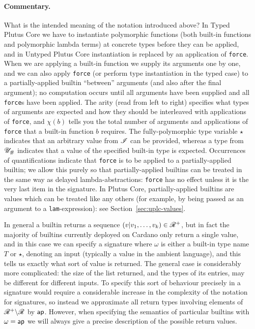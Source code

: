 \paragraph{Commentary.} What is the intended meaning of the notation introduced
above?  In Typed Plutus Core we have to instantiate polymorphic functions (both
built-in functions and polymorphic lambda terms) at concrete types before they
can be applied, and in Untyped Plutus Core instantiation is replaced by an
application of \texttt{force}.  When we are applying a built-in function we
supply its arguments one by one, and we can also apply \texttt{force} (or
perform type instantiation in the typed case) to a partially-applied builtin
``between'' arguments (and also after the final argument); no computation occurs
until all arguments have been supplied and all \texttt{force}s have been
applied. The arity (read from left to right) specifies what types of arguments
are expected and how they should be interleaved with applications of
\texttt{force}, and $\chi(b)$ tells you the total number of arguments and
applications of \texttt{force} that a built-in function $b$ requires. The
fully-polymorphic type variable $\star$ indicates that an arbitrary value from
$\mathscr{I}$ can be provided, whereas a type from ${\mathscr{U}_{\#}}$ indicates that a value
of the specified built-in type is expected. Occurrences of quantifications
indicate that \texttt{force} is to be applied to a partially-applied builtin; we
allow this purely so that partially-applied builtins can be treated in the same
way as delayed lambda-abstractions: \texttt{force} has no effect unless it is
the very last item in the signature.  In Plutus Core, partially-applied
builtins are values which can be treated like any others (for example, by being
passed as an argument to a \texttt{lam}-expression): see
Section~\ref{sec:uplc-values}.

In general a builtin returns a sequence $(v|v_1,\ldots,v_k) \in \mathscr{R}^+$, but in
fact the majority of builtins currently deployed on Cardano only return a single
value, and in this case we can specify a signature where $\omega$ is either a
built-in type name $T$ or $\star$, denoting an input (typically a value in the
ambient language), and this tells us exactly what sort of value is returned.
The general case is considerably more complicated: the size of the list
returned, and the types of its entries, may be different for different
inputs. To specify this sort of behaviour precisely in a signature would require
a considerable increase in the complexity of the notation for signatures, so
instead we approximate all return types involving elements of $\mathscr{R}^+\backslash
\mathscr{R}$ by $\textsf{ap}$.  However, when specifying the semantics of particular builtins
with $\omega = \textsf{ap}$ we will always give a precise description of the possible
return values.

